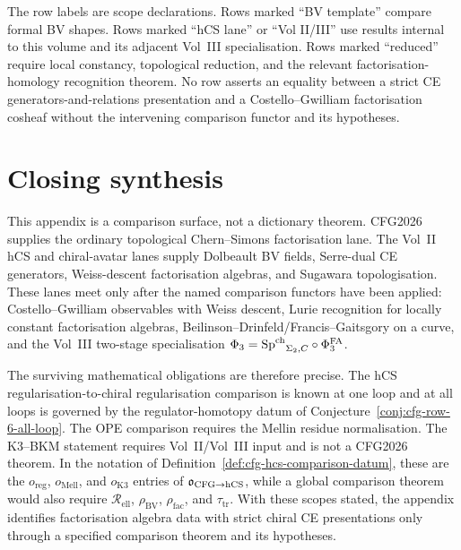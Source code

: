 \begin{remark}
\label{rem:cfg-source-scope}
The row labels are scope declarations. Rows marked ``BV template''
compare formal BV shapes. Rows marked ``hCS lane'' or ``Vol II/III''
use results internal to this volume and its adjacent Vol~III
specialisation. Rows marked ``reduced'' require local constancy,
topological reduction, and the relevant factorisation-homology
recognition theorem. No row asserts an equality between a strict CE
generators-and-relations presentation and a Costello--Gwilliam
factorisation cosheaf without the intervening comparison functor and
its hypotheses.
\end{remark}

\section{Closing synthesis}
\label{sec:cfg-closing}

This appendix is a comparison surface, not a dictionary theorem. CFG2026
supplies the ordinary topological Chern--Simons factorisation lane. The
Vol~II hCS and chiral-avatar lanes supply Dolbeault BV fields,
Serre-dual CE generators, Weiss-descent factorisation algebras, and
Sugawara topologisation. These lanes meet only after the named
comparison functors have been applied: Costello--Gwilliam observables
with Weiss descent, Lurie recognition for locally constant
factorisation algebras, Beilinson--Drinfeld/Francis--Gaitsgory on a
curve, and the Vol~III two-stage specialisation
$\Phi_3={\mathrm{Sp}^{\mathrm{ch}}}_{\Sigma_2,C}\circ\Phi^{\mathrm{FA}}_3$.

The surviving mathematical obligations are therefore precise. The hCS
regularisation-to-chiral regularisation comparison is known at one loop
and at all loops is governed by the regulator-homotopy datum of
Conjecture~\ref{conj:cfg-row-6-all-loop}. The OPE comparison requires
the Mellin residue normalisation. The K3--BKM statement requires
Vol~II/Vol~III input and is not a CFG2026 theorem. In the notation of
Definition~\ref{def:cfg-hcs-comparison-datum}, these are the
\(o_{\mathrm{reg}}\), \(o_{\mathrm{Mell}}\), and
\(o_{\mathrm{K3}}\) entries of
\(\mathfrak o_{\mathrm{CFG}\to\mathrm{hCS}}\), while a global comparison
theorem would also require
\(\mathcal R_{\mathrm{ell}}\), \(\rho_{\mathrm{BV}}\),
\(\rho_{\mathrm{fac}}\), and \(\tau_{\mathrm{tr}}\). With these scopes
stated, the appendix identifies factorisation algebra data with strict
chiral CE presentations only through a specified comparison theorem and
its hypotheses.
